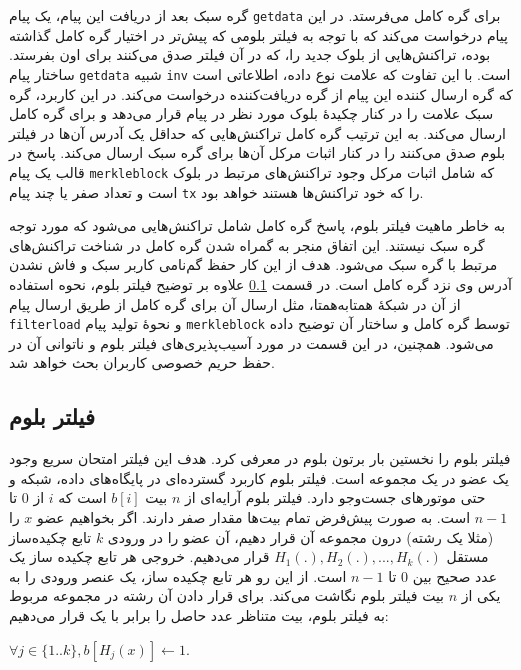 گره سبک بعد از دریافت این پیام، یک پیام \texttt{getdata} برای گره کامل می‌فرستد. در این پیام درخواست می‌کند که با توجه به فیلتر بلومی که پیش‌تر در اختیار گره کامل گذاشته بوده، تراکنش‌هایی از بلوک جدید را، که در آن فیلتر صدق می‌کنند برای اون بفرستد. ساختار پیام \texttt{getdata} شبیه \texttt{inv} است. با این تفاوت که علامت نوع داده،‌ اطلاعاتی است که گره ارسال کننده این پیام از گره دریافت‌کننده درخواست می‌کند. 
در این کاربرد، گره سبک علامت   را در کنار چکیده‌ٔ بلوک مورد نظر در پیام قرار می‌دهد و برای گره کامل ارسال می‌کند. به این ترتیب گره کامل تراکنش‌هایی که حداقل یک آدرس آن‌ها در فیلتر بلوم صدق می‌کنند را در کنار اثبات مرکل آن‌ها برای گره سبک ارسال می‌کند.
پاسخ در قالب یک پیام \texttt{merkleblock} که شامل اثبات مرکل وجود تراکنش‌های مرتبط در بلوک است و تعداد صفر یا چند پیام \texttt{tx} را که خود تراکنش‌ها هستند خواهد بود. 

به خاطر ماهیت فیلتر بلوم، پاسخ گره کامل  شامل تراکنش‌هایی می‌شود که مورد توجه گره سبک نیستند. این اتفاق منجر به گمراه شدن گره کامل در شناخت تراکنش‌های مرتبط با گره سبک می‌شود. هدف از این کار حفظ گم‌نامی کاربر سبک و فاش نشدن آدرس وی نزد گره کامل است. در قسمت \ref{BloomFilter} علاوه بر توضیح فیلتر بلوم، نحوه استفاده از آن در شبکهٔ همتابه‌همتا، مثل ارسال آن برای گره کامل  از طریق ارسال پیام \texttt{filterload} و نحوهٔ تولید پیام \texttt{merkleblock}  توسط گره کامل و ساختار آن توضیح داده می‌شود. همچنین، در این قسمت در مورد آسیب‌پذیری‌های فیلتر بلوم و ناتوانی آن در حفظ حریم خصوصی کاربران بحث خواهد شد.


\subsection{فیلتر بلوم}
\label{BloomFilter}
فیلتر بلوم را نخستین بار برتون بلوم در \cite{Bloom1970} معرفی کرد. هدف این فیلتر امتحان سریع وجود یک عضو در یک مجموعه است. فیلتر بلوم کاربرد گسترده‌ای در پایگاه‌های داده، شبکه و حتی موتور‌های جست‌وجو دارد. فیلتر بلوم آرایه‌ای از $n$ بیت $b[i]$ است که $i$ از $0$ تا$n-1$ است. به صورت پیش‌فرض تمام بیت‌ها مقدار صفر دارند. اگر بخواهیم عضو $x$ را (مثلا یک رشته) درون مجموعه آن قرار دهیم، آن عضو را در ورودی $k$ تابع چکیده‌ساز مستقل
$H_1(.), H_2(.), ..., H_k(.)$
قرار می‌دهیم. خروجی هر تابع چکیده ساز یک عدد صحیح بین $0$ تا $n-1$ است. از این رو هر تابع چکیده ساز، یک عنصر ورودی را به یکی از	 $n$ بیت فیلتر بلوم نگاشت می‌کند. برای قرار دادن آن رشته در مجموعه مربوط به فیلتر بلوم، بیت متناظر عدد حاصل را برابر با یک قرار می‌دهیم: 

$\forall j\in \{1..k\}, b[H_j(x)] \leftarrow 1$.

